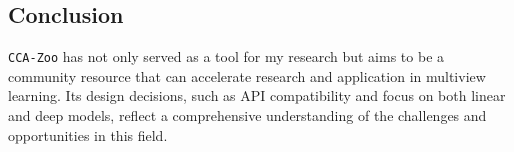\subsection{Conclusion}

\texttt{CCA-Zoo} has not only served as a tool for my research but aims to be a community resource that can accelerate research and application in multiview learning.
Its design decisions, such as API compatibility and focus on both linear and deep models, reflect a comprehensive understanding of the challenges and opportunities in this field.
